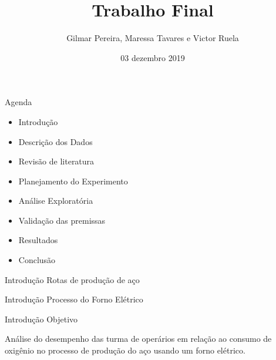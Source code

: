 \documentclass[
  ignorenonframetext,
]{beamer}
\title{Trabalho Final}
\author{Gilmar Pereira, Maressa Tavares e Victor Ruela}
\date{03 dezembro 2019}
\providecommand{\tightlist}{%
  \setlength{\itemsep}{0pt}\setlength{\parskip}{0pt}}
\begin{document}
\frame{\titlepage}

\begin{frame}

\end{frame}

\begin{frame}{Agenda}
\protect\hypertarget{agenda}{}

\begin{itemize}
\tightlist
\item
  Introdução
\item
  Descrição dos Dados
\item
  Revisão de literatura
\item
  Planejamento do Experimento
\item
  Análise Exploratória
\item
  Validação das premissas
\item
  Resultados
\item
  Conclusão
\end{itemize}

\end{frame}

\begin{frame}{Introdução \textbar{} Rotas de produção de aço}
\protect\hypertarget{introducao-rotas-de-producao-de-aco}{}

\end{frame}

\begin{frame}{Introdução \textbar{} Processo do Forno Elétrico}
\protect\hypertarget{introducao-processo-do-forno-eletrico}{}

\end{frame}

\begin{frame}{Introdução \textbar{} Objetivo}
\protect\hypertarget{introducao-objetivo}{}

Análise do desempenho das turma de operários em relação ao consumo de
oxigênio no processo de produção do aço usando um forno elétrico.

\end{frame}
\end{document}
